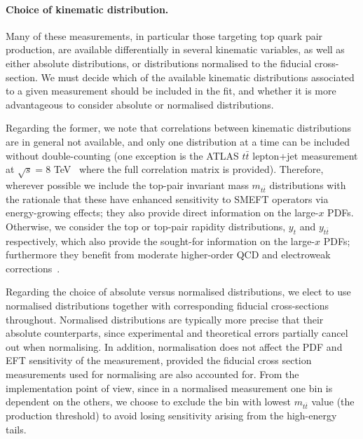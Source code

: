 \documentclass[withindex,glossary]{cam-thesis}
\begin{document}
 \paragraph{Choice of kinematic distribution.}
 Many of these measurements, in particular those targeting
 top quark pair production, are available
  differentially in several kinematic variables,
 as well as either absolute distributions, or distributions normalised
 to the fiducial cross-section.
We must decide which of the
 available kinematic distributions associated to
 a given measurement should be included in the fit,
 and whether it is more advantageous to consider
 absolute or normalised distributions.
 
Regarding the former, we note that correlations between
 kinematic distributions are in general not available, and only one
 distribution at a time can be included without double-counting 
 (one exception is the ATLAS $t\bar{t}$ lepton+jet measurement
 at $\sqrt{s}=8$ TeV~\cite{Aad:2015mbv}
 where the full correlation matrix is provided). Therefore, wherever
 possible we include the top-pair invariant mass $m_{t\bar{t}}$ distributions
 with the rationale that these have enhanced sensitivity to SMEFT
 operators via energy-growing effects; they also provide
 direct information on the large-$x$ PDFs.
 Otherwise, we consider the top or top-pair rapidity distributions,
 $y_{t}$ and $y_{t\bar{t}}$ respectively, which also provide
 the sought-for information on the large-$x$ PDFs;
 furthermore they benefit from moderate
higher-order QCD and electroweak corrections~\cite{Czakon:2016olj}.

Regarding the choice of absolute versus normalised distributions, we elect to use normalised
distributions together with corresponding fiducial cross-sections throughout.
%
Normalised distributions are typically more precise that their absolute counterparts, since
experimental and theoretical errors partially cancel out when normalising.
%
In addition, normalisation does not affect the PDF and EFT sensitivity of the measurement,
provided the fiducial cross section measurements used for normalising are also accounted for.
%
%
From the implementation point of view, since in a normalised measurement one bin is dependent on the others,
we choose to exclude the bin with lowest $m_{t\bar{t}}$ value (the production threshold) to avoid
losing sensitivity arising from the high-energy tails.
\end{document}
